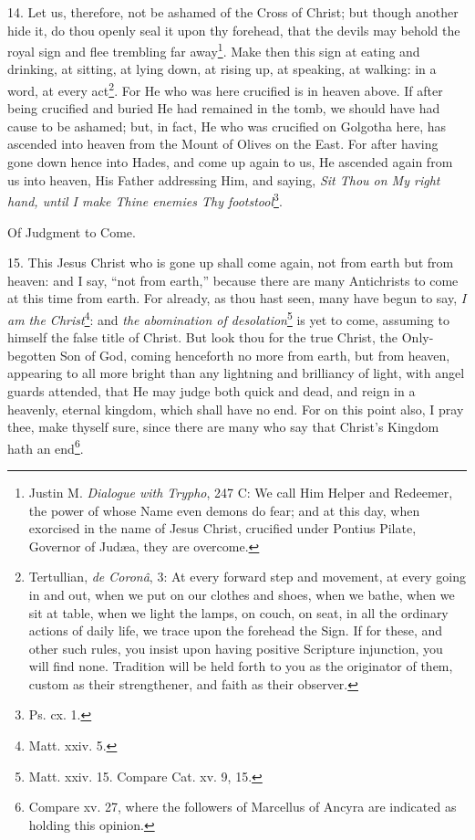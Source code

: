 14. Let us, therefore, not be ashamed of the Cross of Christ; but though another hide it, do thou openly seal it upon thy forehead, that the devils may behold the royal sign and flee trembling far away\footnote{Justin M. \emph{Dialogue with Trypho}, 247 C: We call Him Helper and Redeemer, the power of whose Name even demons do fear; and at this day, when exorcised in the name of Jesus Christ, crucified under Pontius Pilate, Governor of Judæa, they are overcome.}. Make then this sign at eating and drinking, at sitting, at lying down, at rising up, at speaking, at walking: in a word, at every act\footnote{Tertullian, \emph{de Coronâ}, 3: At every forward step and movement, at every going in and out, when we put on our clothes and shoes, when we bathe, when we sit at table, when we light the lamps, on couch, on seat, in all the ordinary actions of daily life, we trace upon the forehead the Sign. If for these, and other such rules, you insist upon having positive Scripture injunction, you will find none. Tradition will be held forth to you as the originator of them, custom as their strengthener, and faith as their observer.}. For He who was here crucified is in heaven above. If after being crucified and buried He had remained in the tomb, we should have had cause to be ashamed; but, in fact, He who was crucified on Golgotha here, has ascended into heaven from the Mount of Olives on the East. For after having gone down hence into Hades, and come up again to us, He ascended again from us into heaven, His Father addressing Him, and saying, \emph{Sit Thou on My right hand, until I make Thine enemies Thy footstool}\footnote{Ps. cx. 1.}.

Of Judgment to Come.

15. This Jesus Christ who is gone up shall come again, not from earth but from heaven: and I say, “not from earth,” because there are many Antichrists to come at this time from earth. For already, as thou hast seen, many have begun to say, \emph{I am the Christ}\footnote{Matt. xxiv. 5.}: and \emph{the abomination of desolation}\footnote{Matt. xxiv. 15. Compare Cat. xv. 9, 15.} is yet to come, assuming to himself the false title of Christ. But look thou for the true Christ, the Only-begotten Son of God, coming henceforth no more from earth, but from heaven, appearing to all more bright than any lightning and brilliancy of light, with angel guards attended, that He may judge both quick and dead, and reign in a heavenly, eternal kingdom, which shall have no end. For on this point also, I pray thee, make thyself sure, since there are many who say that Christ’s Kingdom hath an end\footnote{Compare xv. 27, where the followers of Marcellus of Ancyra are indicated as holding this opinion.}.

